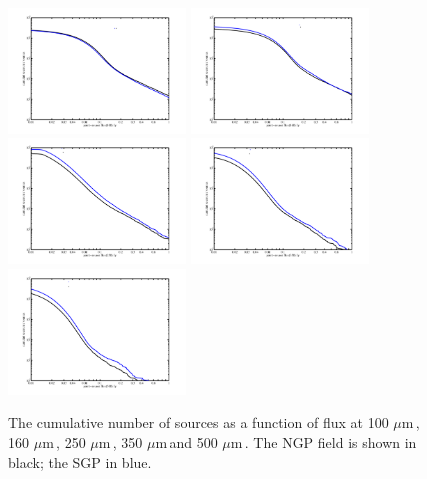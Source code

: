\documentclass[useAMS,usenatbib]{mn2e}
\def\mic{ $\mu $m\,}
\begin{document}
\begin{figure} %
\includegraphics[width=0.42\textwidth,clip,trim={0 9mm 0mm 16mm}]{cum_counts_100.pdf}
\includegraphics[width=0.42\textwidth,clip,trim={0 9mm 0mm 16mm}]{cum_counts_160.pdf}
\includegraphics[width=0.42\textwidth,clip,trim={0 9mm 0mm 16mm}]{cum_counts_250.pdf}
\includegraphics[width=0.42\textwidth,clip,trim={0 9mm 0mm 16mm}]{cum_counts_350.pdf}
\includegraphics[width=0.42\textwidth,clip,trim={0 9mm 0mm 16mm}]{cum_counts_500.pdf}
\caption{\protect\label{fig_cum_flux} The cumulative number of sources as a
  function of flux at 100\mic, 160\mic, 250\mic, 350\mic and 500\mic. The NGP field is
shown in black; the SGP in blue. %
}
\end{figure}
\end{document}
